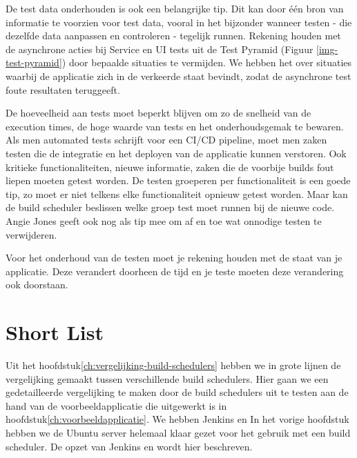 De test data onderhouden is ook een belangrijke tip. Dit kan door één bron van informatie te voorzien voor test data, vooral in het bijzonder wanneer testen - die dezelfde data aanpassen en controleren - tegelijk runnen. Rekening houden met de asynchrone acties bij Service en UI tests uit de Test Pyramid (Figuur \ref{img-test-pyramid}) door bepaalde situaties te vermijden. We hebben het over situaties waarbij de applicatie zich in de verkeerde staat bevindt, zodat de asynchrone test foute resultaten teruggeeft.

De hoeveelheid aan tests moet beperkt blijven om zo de snelheid van de execution times, de hoge waarde van tests en het onderhoudsgemak te bewaren.
Als men automated tests schrijft voor een CI/CD pipeline, moet men zaken testen die de integratie en het deployen van de applicatie kunnen verstoren.
Ook kritieke functionaliteiten, nieuwe informatie, zaken die de voorbije builds fout liepen moeten getest worden. 
De testen groeperen per functionaliteit is een goede tip, zo moet er niet telkens elke functionaliteit opnieuw getest worden. Maar kan de build scheduler beslissen welke groep test moet runnen bij de nieuwe code. 
Angie Jones \textcite{Jones2019} geeft ook nog als tip mee om af en toe wat onnodige testen te verwijderen.

Voor het onderhoud van de testen moet je rekening houden met de staat van je applicatie. Deze verandert doorheen de tijd en je teste moeten deze verandering ook doorstaan.

\section{Short List}
\label{sec:short-list}
Uit het hoofdstuk\ref{ch:vergelijking-build-schedulers} hebben we in grote lijnen de vergelijking gemaakt tussen verschillende build schedulers. Hier gaan we een gedetailleerde vergelijking te maken door de build schedulers uit te testen aan de hand van de voorbeeldapplicatie die uitgewerkt is in hoofdstuk\ref{ch:voorbeeldapplicatie}.
We hebben Jenkins en %
In het vorige hoofdstuk hebben we de Ubuntu server helemaal klaar gezet voor het gebruik met een build scheduler. De opzet van Jenkins en %
wordt hier beschreven.

